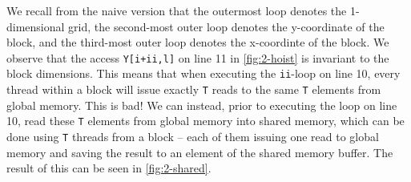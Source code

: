 We recall from the naive version that the outermost loop denotes the
1-dimensional grid, the second-most outer loop denotes the y-coordinate of the
block, and the third-most outer loop denotes the x-coordinte of the block.
We observe that the access \texttt{Y[i+ii,l]} on line 11 in
\autoref{fig:2-hoist} is invariant to the block dimensions.
This means that when executing the \texttt{ii}-loop on line 10, every thread
within a block will issue exactly \texttt{T} reads to the same \texttt{T}
elements from global memory. This is bad!
We can instead, prior to executing the loop on line 10, read these \texttt{T}
elements from global memory into shared memory, which can be done using
\texttt{T} threads from a block -- each of them issuing one read to global
memory and saving the result to an element of the shared memory buffer.
The result of this can be seen in \autoref{fig:2-shared}.

